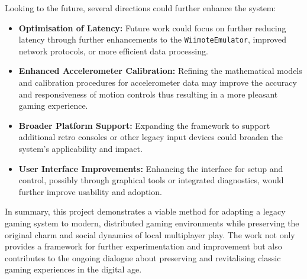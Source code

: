Looking to the future, several directions could further enhance the system:
\begin{itemize}
    \item \textbf{Optimisation of Latency:} Future work could focus on further reducing latency through further enhancements to the \texttt{WiimoteEmulator}, improved network protocols, or more efficient data processing.
    \item \textbf{Enhanced Accelerometer Calibration:} Refining the mathematical models and calibration procedures for accelerometer data may improve the accuracy and responsiveness of motion controls thus resulting in a more pleasant gaming experience.
    \item \textbf{Broader Platform Support:} Expanding the framework to support additional retro consoles or other legacy input devices could broaden the system’s applicability and impact.
    \item \textbf{User Interface Improvements:} Enhancing the interface for setup and control, possibly through graphical tools or integrated diagnostics, would further improve usability and adoption.
\end{itemize}

In summary, this project demonstrates a viable method for adapting a legacy gaming system to modern, distributed gaming environments while preserving the original charm and social dynamics of local multiplayer play. The work not only provides a framework for further experimentation and improvement but also contributes to the ongoing dialogue about preserving and revitalising classic gaming experiences in the digital age.
